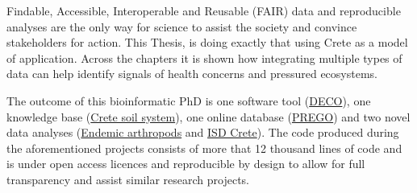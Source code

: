 Findable, Accessible, Interoperable and Reusable (FAIR) data and reproducible analyses
are the only way for science to assist the society and convince stakeholders for action. 
This Thesis, is doing exactly that using Crete as a model of application. Across the chapters it is shown how 
integrating multiple types of data can help identify signals of health concerns and 
pressured ecosystems.

The outcome of this bioinformatic PhD is one software tool (\hyperref[cha:deco]{DECO}),
one knowledge base (\hyperref[cha:crete-idea]{Crete soil system}), one online
database (\hyperref[cha:prego]{PREGO}) and
two novel data analyses (\hyperref[cha:arthropods]{Endemic arthropods} and \hyperref[cha:isd-crete-soil]{ISD Crete}).
The code produced during the aforementioned projects consists of more that 12 thousand lines of code 
and is under open access licences and reproducible by design to allow for full transparency and assist similar research projects. 
